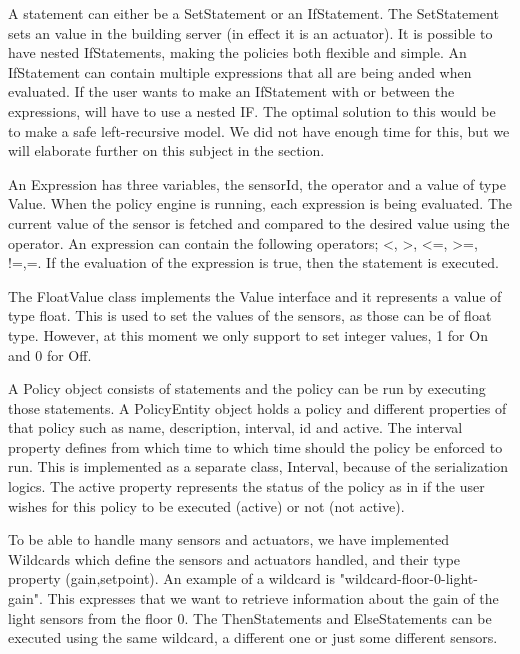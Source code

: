 A statement can either be a SetStatement or an IfStatement. The SetStatement sets an value in the building server (in effect it is an actuator). It is possible to have nested IfStatements, making the policies both flexible and simple. An IfStatement can contain multiple expressions that all are being anded when evaluated. If the user wants to make an IfStatement with or between the expressions, will have to use a nested IF. The optimal solution to this would be to make a safe left-recursive model. We did not have enough time for this, but we will elaborate further on this subject in the  section. 

An Expression has three variables, the sensorId, the operator and a value of type Value. When the policy engine is running, each expression is being evaluated. The current value of the sensor is fetched and compared to the desired value using the operator. An expression can contain the following operators; <, >, <=, >=, !=,=. 
If the evaluation of the expression is true, then the statement is executed.

The FloatValue class implements the Value interface and it represents a value of type float. This is used to set the values of the sensors, as those can be of float type. However, at this moment we only support to set integer values, 1 for On and 0 for Off.

A Policy object consists of statements and the policy can be run by executing those statements. A PolicyEntity object holds a policy and different properties of that policy such as name, description, interval, id and active. The interval property defines from which time to which time should the policy be enforced to run. This is implemented as a separate class, Interval, because of the serialization logics.  The active property represents the status of the policy as in if the user wishes for this policy to be executed (active) or not (not active).

To be able to handle many sensors and actuators, we have implemented Wildcards which define the sensors and actuators handled, and their type property (gain,setpoint). An example of a wildcard is "wildcard-floor-0-light-gain". This expresses that we want to retrieve information about the gain of the light sensors from the floor 0. The  ThenStatements and ElseStatements can be executed using the same wildcard, a different  one or just some different sensors. 
